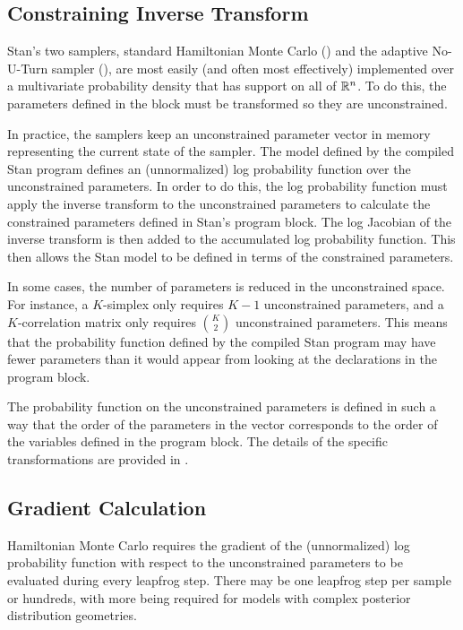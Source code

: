 \subsection{Constraining Inverse Transform}

Stan's two samplers, standard Hamiltonian Monte Carlo (\HMC) and the
adaptive No-U-Turn sampler (\NUTS), are most easily (and often most
effectively) implemented over a multivariate probability density that
has support on all of $\reals^n$.  To do this, the parameters
defined in the  block must be transformed so they are
unconstrained.

In practice, the samplers keep an unconstrained parameter vector in
memory representing the current state of the sampler.  The model
defined by the compiled Stan program defines an (unnormalized) log
probability function over the unconstrained parameters.  In order to
do this, the log probability function must apply the inverse transform
to the unconstrained parameters to calculate the constrained
parameters defined in Stan's  program block.  The
log Jacobian of the inverse transform is then added to the accumulated
log probability function.  This then allows the Stan model to be
defined in terms of the constrained parameters.

In some cases, the number of parameters is reduced in the
unconstrained space.  For instance, a $K$-simplex only requires $K-1$
unconstrained parameters, and a $K$-correlation matrix only requires
$\binom{K}{2}$ unconstrained parameters.  This means that the
probability function defined by the compiled Stan program may have
fewer parameters than it would appear from looking at the declarations
in the  program block.

The probability function on the unconstrained parameters is defined in
such a way that the order of the parameters in the vector corresponds
to the order of the variables defined in the  program
block.  The details of the specific transformations are provided in
.

\subsection{Gradient Calculation}

Hamiltonian Monte Carlo requires the gradient of the (unnormalized)
log probability function with respect to the unconstrained parameters
to be evaluated during every leapfrog step.  There may be one leapfrog
step per sample or hundreds, with more being required for models with
complex posterior distribution geometries.

